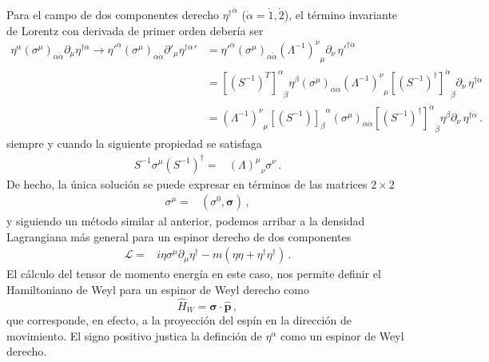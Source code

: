 \begin{frame}
Para el campo de dos componentes derecho  ${\eta^{\dagger}}^{\dot{\alpha}}$ ($\dot{\alpha}=\dot{1},\dot{2}$), el término invariante de Lorentz con derivada de primer orden debería ser
 \begin{align}
   {\eta}^{\alpha}\left( \sigma^{\mu} \right)_{\alpha\dot{\alpha}}\partial_\mu\eta^{\dagger\dot{\alpha}}\to  {\eta'}^{\alpha}\left(\sigma^\mu\right)_{\alpha\dot{\alpha}}\partial'_\mu{\eta^{\dagger \dot{\alpha}}}'
&={\eta'}^{\alpha}\left( \sigma^\mu \right)_{\alpha\dot{\alpha}}{\left(\Lambda^{-1}\right)^\nu}_\mu\partial_\nu \,{\eta'}^{\dagger\dot{\alpha}}\nonumber\\
&={\left[ \left( S^{-1} \right)^T \right]^{\alpha}}_{\beta}{\eta}^{\beta}\left( \sigma^\mu \right)_{\alpha\dot{\alpha}}{\left(\Lambda^{-1}\right)^\nu}_\mu {\left[ \left( S^{-1} \right)^\dagger \right]^{\dot{\alpha}}}_{\dot{\beta}}\partial_\nu \,{\eta}^{\dagger\dot{\alpha}}\nonumber\\
&={\left(\Lambda^{-1}\right)^\nu}_\mu{\left[ \left( S^{-1} \right) \right]_{\beta}}^{\alpha}\left( \sigma^\mu \right)_{\alpha\dot{\alpha}}{\left[ \left( S^{-1} \right)^\dagger \right]^{\dot{\alpha}}}_{\dot{\beta}} {\eta}^{\beta}\partial_\nu \,{\eta}^{\dagger\dot{\alpha}}\,.
\end{align}
siempre y cuando la siguiente propiedad se satisfaga
\begin{align}
\label{eq:ltrincond}
S^{-1}\sigma^\mu \left( S^{-1} \right)^{\dagger}=&{\left(\Lambda\right)^\mu}_\nu \sigma^\nu\,.
\end{align}
De hecho, la única solución se puede expresar en términos de las matrices $2\times2$
   \begin{align} 
 {\sigma}^{\mu} =& \left( \sigma^0,{\boldsymbol{\sigma}} \right)\,, 
\end{align}
y siguiendo un método similar al anterior, podemos arribar a la densidad Lagrangiana más general para un espinor derecho de dos componentes
\begin{align}
  \mathcal{L}=&i{\eta}{\sigma}^\mu\partial_\mu\eta^{\dagger}-
m \left( \eta\eta+\eta^{\dagger}\eta^{\dagger} \right)\,.
\end{align}
El cálculo del tensor de momento energía en este caso, nos permite  definir el Hamiltoniano de Weyl para un espinor de Weyl derecho como
\begin{equation}
  \label{eq:denshal}
  \hat{H}_W= \mathbf{\sigma}\cdot\widehat{\mathbf{p}}\,,
\end{equation}
que corresponde, en efecto, a la proyección del espín en la dirección de movimiento. El signo positivo justica la definción de $\eta^{\dot{\alpha}}$ como un espinor de Weyl derecho.
\end{frame}




